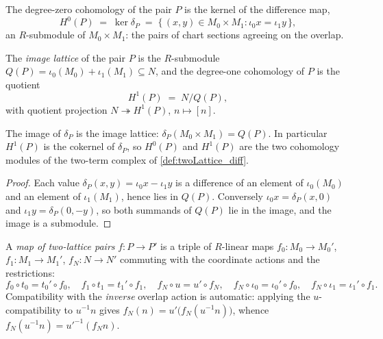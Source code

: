 \begin{definition}[\(H^0\) of a pair]
  \label{def:twoLattice_H0}
  \leanok
  The degree-zero cohomology of the pair \(P\) is the kernel of the difference map,
  \[
    H^0(P) \;=\; \ker \delta_P
    \;=\; \{\, (x, y) \in M_0 \times M_1 : \iota_0 x = \iota_1 y \,\},
  \]
  an \(R\)-submodule of \(M_0 \times M_1\): the pairs of chart sections agreeing on the
  overlap.
\end{definition}

\begin{definition}[\(H^1\) of a pair]
  \label{def:twoLattice_H1}
  \leanok
  The \emph{image lattice} of the pair \(P\) is the \(R\)-submodule
  \(Q(P) = \iota_0(M_0) + \iota_1(M_1) \subseteq N\), and the degree-one cohomology of
  \(P\) is the quotient
  \[
    H^1(P) \;=\; N \big/ Q(P),
  \]
  with quotient projection \(N \twoheadrightarrow H^1(P)\), \(n \mapsto [n]\).
\end{definition}

\begin{lemma}
  \label{lem:twoLattice_range_diff}
  \leanok
  The image of \(\delta_P\) is the image lattice: \(\delta_P(M_0 \times M_1) = Q(P)\).
  In particular \(H^1(P)\) is the cokernel of \(\delta_P\), so \(H^0(P)\) and \(H^1(P)\)
  are the two cohomology modules of the two-term complex of \ref{def:twoLattice_diff}.
\end{lemma}
\begin{proof}
  \leanok
  Each value \(\delta_P(x,y) = \iota_0 x - \iota_1 y\) is a difference of an element of
  \(\iota_0(M_0)\) and an element of \(\iota_1(M_1)\), hence lies in \(Q(P)\).
  Conversely \(\iota_0 x = \delta_P(x, 0)\) and \(\iota_1 y = \delta_P(0, -y)\), so both
  summands of \(Q(P)\) lie in the image, and the image is a submodule.
\end{proof}

\begin{definition}
  \label{def:twoLattice_hom}
  \leanok
  A \emph{map of two-lattice pairs} \(f : P \to P'\) is a triple of \(R\)-linear maps
  \(f_0 : M_0 \to M_0'\), \(f_1 : M_1 \to M_1'\), \(f_N : N \to N'\) commuting with the
  coordinate actions and the restrictions:
  \[
    f_0 \circ t_0 = t_0' \circ f_0, \quad
    f_1 \circ t_1 = t_1' \circ f_1, \quad
    f_N \circ u = u' \circ f_N, \quad
    f_N \circ \iota_0 = \iota_0' \circ f_0, \quad
    f_N \circ \iota_1 = \iota_1' \circ f_1 .
  \]
  Compatibility with the \emph{inverse} overlap action is automatic: applying the
  \(u\)-compatibility to \(u^{-1} n\) gives \(f_N(n) = u'\bigl(f_N(u^{-1} n)\bigr)\),
  whence \(f_N(u^{-1} n) = u'^{-1}(f_N n)\).
\end{definition}

